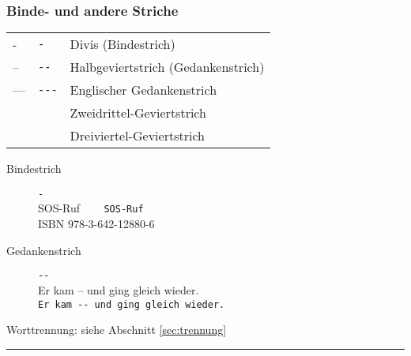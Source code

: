 \subsubsection*{Binde- und andere Striche}
\begin{tabular}{L{1ex}L{4em}L{11em}}
-			&  \lstinline|-| &  		Divis (Bindestrich)
\\
--		&  \lstinline|--| &  		Halbgeviertstrich (Gedankenstrich)
\\
---		&  \lstinline|---| &  	Englischer Gedankenstrich
\\
\texttwelveudash{} &  \   &  Zweidrittel-Geviertstrich
\\
\textthreequartersemdash{} 
&  \ 
&   Dreiviertel-Geviertstrich
\end{tabular}

%
\begin{description}
	\item[Bindestrich] \lstinline|-|	\\
SOS-Ruf ~~~ \lstinline|SOS-Ruf|	\\
ISBN 978-3-642-12880-6

\item[Gedankenstrich] \lstinline|--| \\
	Er kam -- und ging gleich wieder.\\
	\lstinline|Er kam -- und ging gleich wieder.|
\end{description}

Worttrennung: siehe Abschnitt \ref{sec:trennung}

\setlength{\columnseprule}{0.5pt}
\hrule \vspace{0.5\baselineskip}
